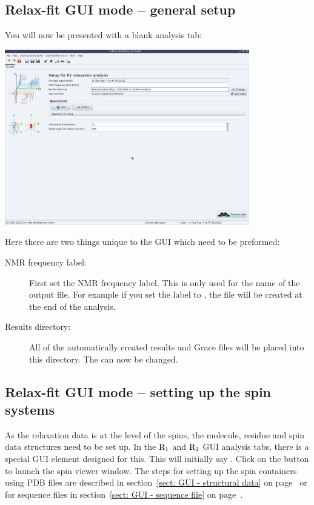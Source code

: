 
\subsection{Relax-fit GUI mode -- general setup}

You will now be presented with a blank analysis tab:

\begin{minipage}[h]{\linewidth}
\centerline{\includegraphics[width=0.8\textwidth, bb=14 14 1415 1019]{graphics/screenshots/r1_analysis/blank}}
\end{minipage}

Here there are two things unique to the GUI which need to be preformed:

\begin{description}
\item[NMR frequency label:]  First set the NMR frequency label.  This is only used for the name of the output file.  For example if you set the label to , the file  will be created at the end of the analysis.
\item[Results directory:]  All of the automatically created results and Grace files will be placed into this directory.  The  can now be changed.
\end{description}



\subsection{Relax-fit GUI mode -- setting up the spin systems}

As the relaxation data is at the level of the spins, the molecule, residue and spin data structures need to be set up.  In the $\mathrm{R}_1$ and $\mathrm{R}_2$ GUI analysis tabs, there is a special  GUI element designed for this.  This will initially say .  Click on the  button to launch the spin viewer window.  The steps for setting up the spin containers using PDB files are described in section~\ref{sect: GUI - structural data} on page~\pageref{sect: GUI - structural data} or for sequence files in section~\ref{sect: GUI - sequence file} on page~\pageref{sect: GUI - sequence file}.


